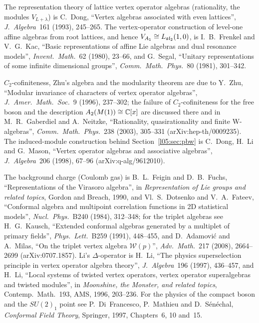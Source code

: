 The representation theory of lattice vertex operator algebras (rationality, the modules $V_{L+\lambda}$) is
C.~Dong, ``Vertex algebras associated with even lattices'', \emph{J.\ Algebra}~161 (1993), 245--265. The vertex-operator
construction of level-one affine algebras from root lattices, and hence $V_{A_1}\cong L_{\mathfrak{sl}_2}(1,0)$, is I.~B.~Frenkel and
V.~G.~Kac, ``Basic representations of affine Lie algebras and dual resonance models'', \emph{Invent.\ Math.}~62 (1980),
23--66, and G.~Segal, ``Unitary representations of some infinite dimensional groups'', \emph{Comm.\ Math.\ Phys.}~80 (1981),
301--342.

$C_2$-cofiniteness, Zhu's algebra and the modularity theorem are due to Y.~Zhu, ``Modular invariance of characters of vertex
operator algebras'', \emph{J.\ Amer.\ Math.\ Soc.}~9 (1996), 237--302; the failure of $C_2$-cofiniteness for the free boson and
the description $A_2(M(1))\cong{\mathbb{C}}[x]$ are discussed there and in M.~R.~Gaberdiel and A.~Neitzke, ``Rationality,
quasirationality and finite W-algebras'', \emph{Comm.\ Math.\ Phys.}~238 (2003), 305--331 (arXiv:hep-th/0009235). The
induced-module construction behind Section~\ref{l05:sec:pbw} is C.~Dong, H.~Li and G.~Mason, ``Vertex operator algebras and
associative algebras'', \emph{J.\ Algebra}~206 (1998), 67--96 (arXiv:q-alg/9612010).

The background charge (Coulomb gas) is B.~L.~Feigin and D.~B.~Fuchs, ``Representations of the Virasoro algebra'', in
\emph{Representation of Lie groups and related topics}, Gordon and Breach, 1990, and Vl.~S.~Dotsenko and V.~A.~Fateev,
``Conformal algebra and multipoint correlation functions in 2D statistical models'', \emph{Nucl.\ Phys.}~B240 (1984),
312--348; for the triplet algebras see H.~G.~Kausch, ``Extended conformal algebras generated by a multiplet of primary
fields'', \emph{Phys.\ Lett.}~B259 (1991), 448--455, and D.~Adamovi\'c and A.~Milas, ``On the triplet vertex algebra
$\mathcal W(p)$'', \emph{Adv.\ Math.}~217 (2008), 2664--2699 (arXiv:0707.1857). Li's $\Delta$-operator is H.~Li,
``The physics superselection principle in vertex operator algebra theory'', \emph{J.\ Algebra}~196 (1997), 436--457, and
H.~Li, ``Local systems of twisted vertex operators, vertex operator superalgebras and twisted modules'', in
\emph{Moonshine, the Monster, and related topics}, Contemp.\ Math.~193, AMS, 1996, 203--236. For the physics of the
compact boson and the $SU(2)_1$ point see P.~Di~Francesco, P.~Mathieu and D.~S\'en\'echal, \emph{Conformal Field Theory},
Springer, 1997, Chapters~6, 10 and~15.
\endgroup

